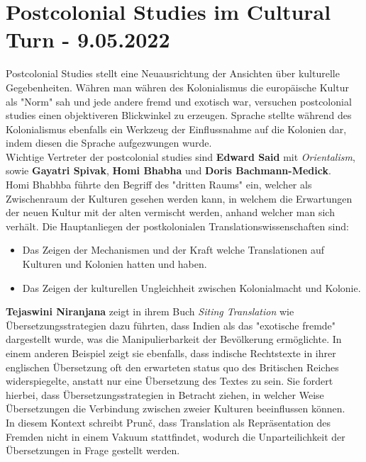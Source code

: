 \documentclass{article}
\begin{document}
	\section{Postcolonial Studies im Cultural Turn - 9.05.2022}
	Postcolonial Studies stellt eine Neuausrichtung der Ansichten über kulturelle Gegebenheiten. Währen man währen des Kolonialismus die europäische Kultur als "Norm" sah und jede andere fremd und exotisch war, versuchen postcolonial studies einen objektiveren Blickwinkel zu erzeugen. Sprache stellte während des Kolonialismus ebenfalls ein Werkzeug der Einflussnahme auf die Kolonien dar, indem diesen die Sprache aufgezwungen wurde. \\
	Wichtige Vertreter der postcolonial studies sind \textbf{Edward Said} mit \textit{Orientalism}, sowie \textbf{Gayatri Spivak}, \textbf{Homi Bhabha} und \textbf{Doris Bachmann-Medick}.\\
	Homi Bhabhba führte den Begriff des "dritten Raums" ein, welcher als Zwischenraum der Kulturen gesehen werden kann, in welchem die Erwartungen der neuen Kultur mit der alten vermischt werden, anhand welcher man sich verhält.
	Die Hauptanliegen der postkolonialen Translationswissenschaften sind:
	\begin{itemize}
		\item{Das Zeigen der Mechanismen und der Kraft welche Translationen auf Kulturen und Kolonien hatten und haben.}
		\item{Das Zeigen der kulturellen Ungleichheit zwischen Kolonialmacht und Kolonie.}
	\end{itemize}
	\textbf{Tejaswini Niranjana} zeigt in ihrem Buch \textit{Siting Translation} wie Übersetzungsstrategien dazu führten, dass Indien als das "exotische fremde" dargestellt wurde, was die Manipulierbarkeit der Bevölkerung ermöglichte. In einem anderen Beispiel zeigt sie ebenfalls, dass indische Rechtstexte in ihrer englischen Übersetzung oft den erwarteten status quo des Britischen Reiches widerspiegelte, anstatt nur eine Übersetzung des Textes zu sein. Sie fordert hierbei, dass Übersetzungsstrategien in Betracht ziehen, in welcher Weise Übersetzungen die  Verbindung zwischen zweier Kulturen beeinflussen können. \\
	In diesem Kontext schreibt Prun\v c, dass Translation als Repräsentation des Fremden nicht in einem Vakuum stattfindet, wodurch die Unparteilichkeit der Übersetzungen in Frage gestellt werden. \\
\end{document}
